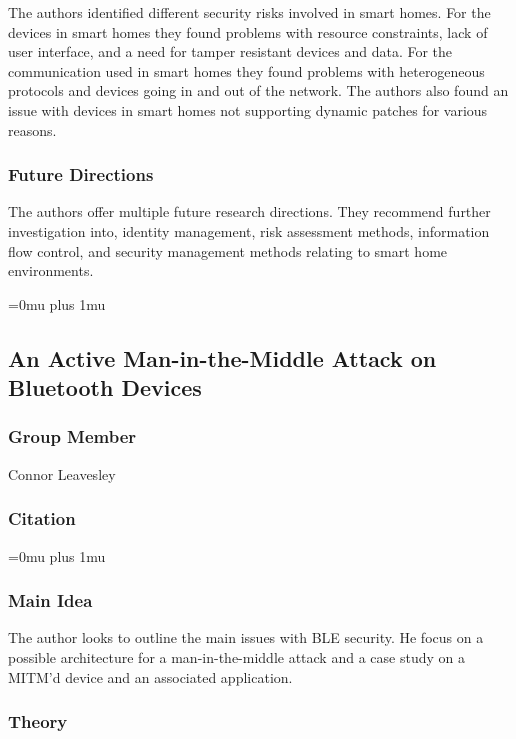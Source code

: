\noindent
The authors identified different security risks involved in smart homes. For the devices in smart homes they found problems with resource constraints, lack of user interface, and a need for tamper resistant devices and data. For the communication used in smart homes they found problems with heterogeneous protocols and devices going in and out of the network. The authors also found an issue with devices in smart homes not supporting dynamic patches for various reasons. 

\subsubsection{Future Directions}

\noindent
The authors offer multiple future research directions. They recommend further investigation into, identity management, risk assessment methods, information flow control, and security management methods relating to smart home environments. 

\Urlmuskip=0mu plus 1mu\relax

\noindent
\subsection{An Active Man-in-the-Middle Attack on Bluetooth Devices}

\subsubsection{Group Member}

\noindent
Connor Leavesley

\noindent
\subsubsection{Citation}

\Urlmuskip=0mu plus 1mu\relax

\subsubsection{Main Idea}

\noindent
The author looks to outline the main issues with BLE security. He focus on a possible architecture for a man-in-the-middle attack and a case study on a MITM'd device and an associated application. 

\subsubsection{Theory}


